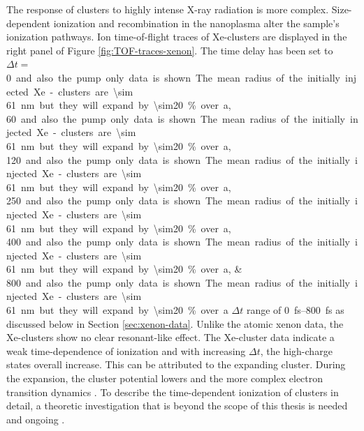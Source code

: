 The response of clusters to highly intense X-ray radiation is more complex. Size-dependent ionization \citep{Schorb-2012-PRL,Schutte-2015-JPhysB} and recombination in the nanoplasma \citep{Schutte-2014-PRL} alter the sample's ionization pathways. Ion time-of-flight traces of Xe-clusters are displayed in the right panel of Figure \ref{fig:TOF-traces-xenon}. The time delay has been set to $\Delta t=$\SIlist{0;60;120;250;400;800} and also the pump only data is shown. The mean radius of the initially injected Xe-clusters are \SI{\sim 61}{\nano\meter} but they will expand by \SI{\sim20}{\percent} over a $\Delta t$ range of \SIrange{0}{800}{\femto\second} as discussed below in Section \ref{sec:xenon-data}. Unlike the atomic xenon data, the Xe-clusters show no clear resonant-like effect. The Xe-cluster data indicate a weak time-dependence of ionization and with increasing $\Delta t$, the high-charge states overall increase. This can be attributed to the expanding cluster. During the expansion, the cluster potential lowers \cite{Arbeiter-2011-NJP} and the more complex electron transition dynamics \cite{Krikunova-2009-NJP}. To describe the time-dependent ionization of clusters in detail, a theoretic investigation that is beyond the scope of this thesis is needed and ongoing \cite{Ho-2016-PC}.
